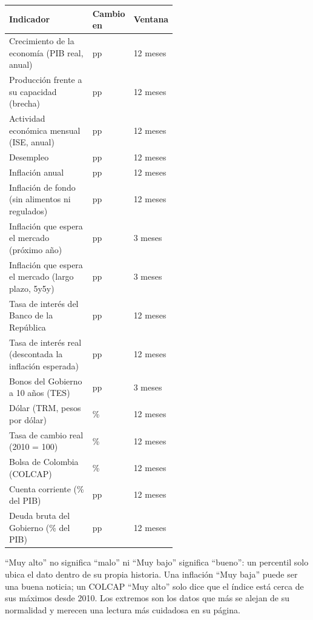 \begin{center}\small
\begin{longtable}{@{}p{0.55\linewidth}ll@{}}
\toprule
\textbf{Indicador} & \textbf{Cambio en} & \textbf{Ventana}\\\midrule\endhead
Crecimiento de la economía (PIB real, anual) & pp & 12 meses\\
Producción frente a su capacidad (brecha) & pp & 12 meses\\
Actividad económica mensual (ISE, anual) & pp & 12 meses\\
Desempleo & pp & 12 meses\\
Inflación anual & pp & 12 meses\\
Inflación de fondo (sin alimentos ni regulados) & pp & 12 meses\\
Inflación que espera el mercado (próximo año) & pp & 3 meses\\
Inflación que espera el mercado (largo plazo, 5y5y) & pp & 3 meses\\
Tasa de interés del Banco de la República & pp & 12 meses\\
Tasa de interés real (descontada la inflación esperada) & pp & 12 meses\\
Bonos del Gobierno a 10 años (TES) & pp & 3 meses\\
Dólar (TRM, pesos por dólar) & \% & 12 meses\\
Tasa de cambio real (2010 = 100) & \% & 12 meses\\
Bolsa de Colombia (COLCAP) & \% & 12 meses\\
Cuenta corriente (\% del PIB) & pp & 12 meses\\
Deuda bruta del Gobierno (\% del PIB) & pp & 12 meses\\
\bottomrule
\end{longtable}
\end{center}

\begin{leer}
``Muy alto'' no significa ``malo'' ni ``Muy bajo'' significa ``bueno'': un percentil solo ubica el dato dentro de
su propia historia. Una inflación ``Muy baja'' puede ser una buena noticia; un COLCAP ``Muy alto'' solo dice
que el índice está cerca de sus máximos desde 2010. Los extremos son los datos que más se alejan de su
normalidad y merecen una lectura más cuidadosa en su página.
\end{leer}

